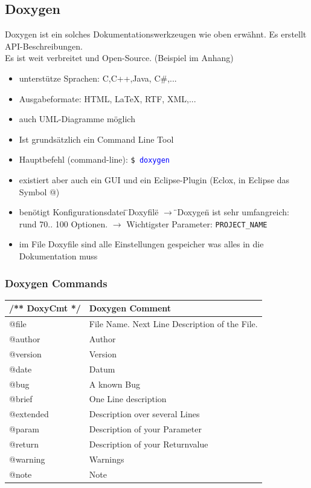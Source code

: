 \subsection{Doxygen}
Doxygen ist ein solches Dokumentationswerkzeugen wie oben erwähnt. Es erstellt API-Beschreibungen.\\
Es ist weit verbreitet und Open-Source. (Beispiel im Anhang)
\begin{itemize}
	\item unterstütze Sprachen: C,C++,Java, C\#,...
	\item Ausgabeformate: HTML, LaTeX, RTF, XML,...
	\item auch UML-Diagramme möglich
	\item Ist grundsätzlich ein Command Line Tool
	\item Hauptbefehl (command-line): \texttt{\$ \textcolor{blue}{doxygen}}
	\item existiert aber auch ein GUI und ein Eclipse-Plugin (Eclox, in Eclipse das Symbol @)
	\item benötigt Konfigurationsdatei \"{}Doxyfile\"{} \newline
	 $\rightarrow$ \"{}Doxygen\"{} ist sehr umfangreich: rund 70.. 100 Optionen. \newline $\rightarrow$ Wichtigster Parameter: \texttt{PROJECT\_NAME} 
	\item im File Doxyfile sind alle Einstellungen gespeicher was alles in die Dokumentation muss
\end{itemize}
   \renewcommand{\arraystretch}{1.3}
    \begin{minipage}{0.5\linewidth}
        \subsubsection{Doxygen Commands}
        \begin{tabular}{|l|l|}
        	\hline	/** DoxyCmt */  &  Doxygen Comment\\ 
        	\hline	@file	      	& File Name. Next Line Description of the File.\\
        	\hline	@author 	    & Author\\
        	\hline	@version	    & Version \\
        	\hline   @date		    & Datum   \\ 
        	\hline   @bug    		& A known Bug \\
        	\hline   @brief	    	& One Line description  \\
        	\hline   @extended	    & Description over several Lines  \\
        	\hline   @param	       	& Description of your Parameter  \\
        	\hline   @return	    & Description of your Returnvalue     \\ 
        	\hline   @warning	    & Warnings \\ 
        	\hline   @note		    & Note\\ 
        	\hline        
        \end{tabular}
    \end{minipage}
